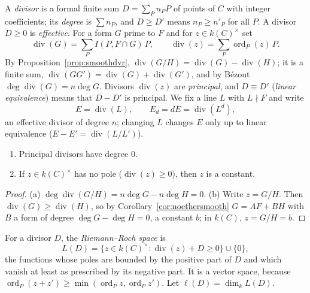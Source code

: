 A \emph{divisor} is a formal finite sum $D=\sum_Pn_PP$ of points of $C$ with integer coefficients; its \emph{degree} is $\sum n_P$, and $D\ge D'$ means
$n_P\ge n'_P$ for all $P$. A divisor $D\ge0$ is \emph{effective}. For a form $G$ prime to $F$ and for $z\in k(C)^\times$ set
\[
\operatorname{div}(G)=\sum_PI(P,F\cap G)\,P,\qquad\operatorname{div}(z)=\sum_P\operatorname{ord}_P(z)\,P.
\]
By Proposition~\ref{prop:smoothdvr}, $\operatorname{div}(G/H)=\operatorname{div}(G)-\operatorname{div}(H)$; it is a finite sum, $\operatorname{div}(GG')=\operatorname{div}(G)+\operatorname{div}(G')$, and by
B\'ezout $\deg\operatorname{div}(G)=n\deg G$. Divisors $\operatorname{div}(z)$ are \emph{principal}, and $D\equiv D'$ (\emph{linear equivalence}) means that
$D-D'$ is principal. We fix a line $L$ with $L\nmid F$ and write
\[
E=\operatorname{div}(L),\qquad E_d=dE=\operatorname{div}(L^d),
\]
an effective divisor of degree $n$; changing $L$ changes $E$ only up to linear equivalence ($E-E'=\operatorname{div}(L/L')$).

\begin{proposition}\label{prop:divbasic}
\begin{enumerate}[label=(\alph*)]
\item Principal divisors have degree $0$.
\item If $z\in k(C)^\times$ has no pole ($\operatorname{div}(z)\ge0$), then $z$ is a constant.
\end{enumerate}
\end{proposition}
\begin{proof}
(a) $\deg\operatorname{div}(G/H)=n\deg G-n\deg H=0$. (b) Write $z=G/H$. Then $\operatorname{div}(G)\ge\operatorname{div}(H)$, so by Corollary~\ref{cor:noethersmooth}
$G=AF+BH$ with $B$ a form of degree $\deg G-\deg H=0$, a constant $b$; in $k(C)$, $z=G/H=b$.
\end{proof}

For a divisor $D$, the \emph{Riemann--Roch space} is
\[
L(D)=\{z\in k(C)^\times:\operatorname{div}(z)+D\ge0\}\cup\{0\},
\]
the functions whose poles are bounded by the positive part of $D$ and which vanish at least as prescribed by its negative part. It is a vector
space, because $\operatorname{ord}_P(z+z')\ge\min(\operatorname{ord}_Pz,\operatorname{ord}_Pz')$. Let $\ell(D)=\dim_kL(D)$.

